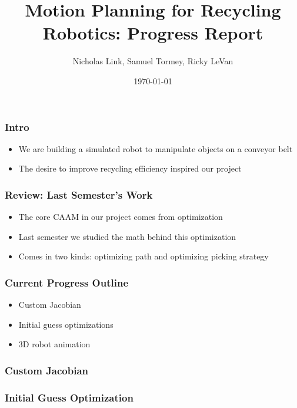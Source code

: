 \documentclass{beamer}
\title[Recycle Robot]{Motion Planning for Recycling Robotics: Progress Report} %
\author[Link, Tormey, LeVan]{Nicholas Link, Samuel Tormey, Ricky LeVan} %
\date{\today} %
\begin{document}
\begin{frame}
\titlepage %

\end{frame}

\begin{frame}
\frametitle{Intro}
\begin{itemize}
\item We are building a simulated robot to manipulate objects on a conveyor belt
\item The desire to improve recycling efficiency inspired our project
\end{itemize}



\end{frame}


\begin{frame}
\frametitle{Review: Last Semester's Work}
\begin{itemize}
\item The core CAAM in our project comes from optimization
\item Last semester we studied the math behind this optimization
\item Comes in two kinds: optimizing path and optimizing picking strategy
\end{itemize}

\end{frame}



\begin{frame}
\frametitle{Current Progress Outline}
\begin{itemize}
\item Custom Jacobian
\item Initial guess optimizations
\item 3D robot animation
\end{itemize}

\end{frame}



\begin{frame}
\frametitle{Custom Jacobian}

\end{frame}




\begin{frame}
\frametitle{Initial Guess Optimization}

\end{frame}
\end{document}
